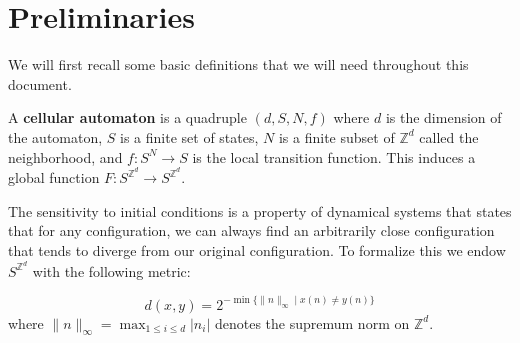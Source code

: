 \documentclass{llncs}
\begin{document}
\begin{table}[h] 
\centering 
\caption{Descriptive complexity of K{\r{u}}rka's classification of cellular automata. The set $\mathcal{E}$ denotes the equicontinuity points. The notation $\Pi^0_2$-c indicates $\Pi^0_2$-completeness, while $\Sigma^0_1$-? signifies that completeness is unknown. A question mark (?) indicates that both completeness and the position in the hierarchy are unknown. Our contributions are highlighted with an asterisk.}

\label{tab:classification} 
\end{table}

\section{Preliminaries}\label{sec:prel}

We will first recall some basic definitions that we will need throughout this document.

\begin{definition}
A \textbf{cellular automaton} is a quadruple $(d, S, N, f)$ where $d$ is the dimension of the automaton, $S$ is a finite set of states, $N$ is a finite subset of $\mathbb{Z}^d$ called the neighborhood, and $f: S^N \to S$ is the local transition function. This induces a global function $F: S^{\mathbb{Z}^d} \to S^{\mathbb{Z}^d}$.
\end{definition}

The sensitivity to initial conditions is a property of dynamical systems that states that for any configuration, we can always find an arbitrarily close configuration that tends to diverge from our original configuration. 
To formalize this we endow $S^{\mathbb{Z}^d}$ with the following metric:

\begin{equation}
d(x, y) = 2^{-\min\{\|n\|_\infty \mid x(n) \neq y(n)\}}
\end{equation}
where $ \|n\|_\infty = \max_{1 \le i \le d} |n_i| $ denotes the supremum norm on \( \mathbb{Z}^d \).
 
\end{document}
